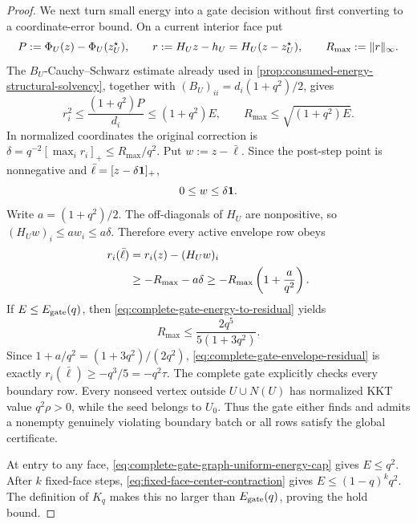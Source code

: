\begin{proof}
We next turn small energy into a gate decision without first converting to a
coordinate-error bound.  On a current interior face put
\begin{equation*}
 P:=\Phi_U(z)-\Phi_U(z_U^\star),
 \qquad r:=H_Uz-h_U=H_U(z-z_U^\star),
 \qquad R_{\max}:=\lVert r\rVert_\infty.
\end{equation*}
The $B_U$-Cauchy--Schwarz estimate already used in
\cref{prop:consumed-energy-structural-solvency}, together with
$(B_U)_{ii}=d_i(1+q^2)/2$, gives
\begin{equation}
 r_i^2
 \leq\frac{(1+q^2)P}{d_i}
 \leq(1+q^2)E,
 \qquad
 R_{\max}\leq\sqrt{(1+q^2)E}.
 \label{eq:complete-gate-energy-to-residual}
\end{equation}
In normalized coordinates the original correction is
$\delta=q^{-2}[\max_i r_i]_+\leq R_{\max}/q^2$.  Put
$w:=z-\bar\ell$.  Since the post-step point is nonnegative and
$\bar\ell=[z-\delta\mathbf{1}]_+$,
\begin{equation*}
 0\leq w\leq\delta\mathbf{1}.
\end{equation*}
Write $a=(1+q^2)/2$.  The off-diagonals of $H_U$ are nonpositive, so
$(H_Uw)_i\leq aw_i\leq a\delta$.  Therefore every active envelope row obeys
\begin{align}
 r_i(\bar\ell)
 &=r_i(z)-(H_Uw)_i\notag\\
 &\geq-R_{\max}-a\delta
 \geq-R_{\max}\left(1+\frac a{q^2}\right).
 \label{eq:complete-gate-envelope-residual}
\end{align}
If $E\leq E_{\rm gate}(q)$, then
\cref{eq:complete-gate-energy-to-residual} yields
\begin{equation*}
 R_{\max}
 \leq\frac{2q^5}{5(1+3q^2)}.
\end{equation*}
Since $1+a/q^2=(1+3q^2)/(2q^2)$,
\cref{eq:complete-gate-envelope-residual} is exactly
$r_i(\bar\ell)\geq-q^3/5=-q^2\tau$.  The complete gate explicitly checks every
boundary row.  Every nonseed vertex outside $U\cup N(U)$ has normalized KKT
value $q^2\rho>0$, while the seed belongs to $U_0$.  Thus the gate either
finds and admits a nonempty genuinely violating boundary batch or all rows
satisfy the global certificate.

At entry to any face, \cref{eq:complete-gate-graph-uniform-energy-cap} gives
$E\leq q^2$.  After $k$ fixed-face steps,
\cref{eq:fixed-face-center-contraction} gives
$E\leq(1-q)^kq^2$.  The definition of $K_q$ makes this no larger than
$E_{\rm gate}(q)$, proving the hold bound.


\end{proof}
